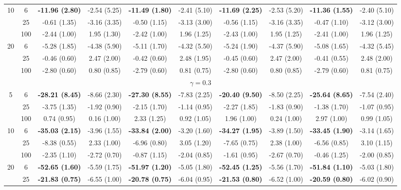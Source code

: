 \documentclass[
  man]{apa6}
\newenvironment{lltable}{\begin{landscape}\centering\begin{ThreePartTable}}{\end{ThreePartTable}\end{landscape}}
\begin{document}
\begin{lltable}
{\begin{longtable}{cccccccccc}
10 & 6 & \textbf{-11.96 (2.80)} & -2.54 (5.25) & \textbf{-11.49 (1.80)} & -2.41 (5.10) & \textbf{-11.69 (2.25)} & -2.53 (5.20) & \textbf{-11.36 (1.55)} & -2.40 (5.10)\\
 & 25 & -0.61 (1.35) & -3.16 (3.35) & -0.50 (1.15) & -3.13 (3.00) & -0.56 (1.15) & -3.16 (3.35) & -0.47 (1.10) & -3.12 (3.00)\\
 & 100 & -2.44 (1.00) & 1.95 (1.30) & -2.42 (1.00) & 1.96 (1.25) & -2.43 (1.00) & 1.95 (1.25) & -2.41 (1.00) & 1.96 (1.25)\\
20 & 6 & -5.28 (1.85) & -4.38 (5.90) & -5.11 (1.70) & -4.32 (5.50) & -5.24 (1.90) & -4.37 (5.90) & -5.08 (1.65) & -4.32 (5.45)\\
 & 25 & -0.46 (0.60) & 2.47 (2.00) & -0.42 (0.60) & 2.48 (1.95) & -0.45 (0.60) & 2.47 (2.00) & -0.41 (0.55) & 2.48 (2.00)\\
 & 100 & -2.80 (0.60) & 0.80 (0.85) & -2.79 (0.60) & 0.81 (0.75) & -2.80 (0.60) & 0.80 (0.85) & -2.79 (0.60) & 0.81 (0.75)\\
\multicolumn{10}{c}{$\gamma = 0.3$}\\
5 & 6 & \textbf{-28.21 (8.45)} & -8.66 (2.30) & \textbf{-27.30 (8.55)} & -7.83 (2.25) & \textbf{-20.40 (9.50)} & -8.50 (2.25) & \textbf{-25.64 (8.65)} & -7.54 (2.40)\\
 & 25 & -3.75 (1.35) & -1.92 (0.90) & -2.15 (1.70) & -1.14 (0.95) & -2.27 (1.85) & -1.83 (0.90) & -1.38 (1.70) & -1.07 (0.95)\\
 & 100 & 0.74 (0.95) & 0.16 (1.00) & 2.33 (1.25) & 0.92 (1.05) & 1.96 (1.00) & 0.24 (1.00) & 2.97 (1.00) & 0.99 (1.05)\\
10 & 6 & \textbf{-35.03 (2.15)} & -3.96 (1.55) & \textbf{-33.84 (2.00)} & -3.20 (1.60) & \textbf{-34.27 (1.95)} & -3.89 (1.50) & \textbf{-33.45 (1.90)} & -3.14 (1.65)\\
 & 25 & -8.38 (0.55) & 2.33 (1.00) & -6.96 (0.80) & 3.05 (1.20) & -7.65 (0.75) & 2.38 (1.00) & -6.56 (0.85) & 3.10 (1.15)\\
 & 100 & -2.35 (1.10) & -2.72 (0.70) & -0.87 (1.15) & -2.04 (0.85) & -1.61 (0.95) & -2.67 (0.70) & -0.46 (1.25) & -2.00 (0.85)\\
20 & 6 & \textbf{-52.65 (1.60)} & -5.59 (1.75) & \textbf{-51.97 (1.20)} & -5.05 (1.80) & \textbf{-52.45 (1.25)} & -5.56 (1.70) & \textbf{-51.84 (1.10)} & -5.03 (1.80)\\
 & 25 & \textbf{-21.83 (0.75)} & -6.55 (1.00) & \textbf{-20.78 (0.75)} & -6.04 (0.95) & \textbf{-21.53 (0.80)} & -6.52 (1.00) & \textbf{-20.59 (0.80)} & -6.02 (0.90)\\

\end{longtable}}
\end{lltable}
\end{document}
